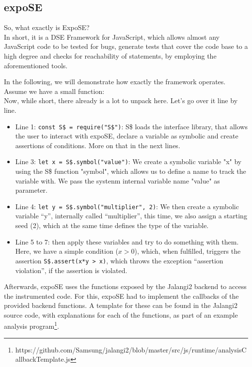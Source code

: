 \newpage
\subsection{expoSE}
\label{sec:expose}
So, what exactly is ExpoSE? \\
In short, it is a DSE Framework for JavaScript, which allows almost any JavaScript code to be tested for bugs, generate tests that cover the code base to a high degree and checks for reachability of statements, by employing the aforementioned tools. \cite{loring_expose_2017}

In the following, we will demonstrate how exactly the framework operates. \\
Assume we have a small function:\\
Now, while short, there already is a lot to unpack here. Let's go over it line by line. 
\begin{itemize}
    \item Line 1: \lstinline{const S$ = require("S$")}: S\$ loads the interface library, that allows the user to interact with expoSE, declare a variable as symbolic and create assertions of conditions. More on that in the next lines.
    \item Line 3: \lstinline{let x = S$.symbol("value")}: We create a symbolic variable "x" by using the S\$ function "symbol", which allows us to define a name to track the variable with. We pass the systenm internal variable name "value" as parameter.  
    \item Line 4: \lstinline{let y = S$.symbol("multiplier", 2)}: We then create a symbolic variable “y”, internally called “multiplier”, this time, we also assign a starting seed (2), which at the same time defines the type of the variable.
    \item Line 5 to 7: then apply these variables and try to do something with them. Here, we have a simple condition ($x > 0$), which, when fulfilled, triggers the assertion \lstinline{S$.assert(x*y > x)}, which throws the exception “assertion violation”, if  the assertion is violated.
\end{itemize}
Afterwards, expoSE uses the functions exposed by the Jalangi2 backend  to access the instrumented code. For this, expoSE had to implement the callbacks of the provided backend functions. A template for these can be found in the Jalangi2 source code, with explanations for each of the functions, as part of an example analysis program\footnote{https://github.com/Samsung/jalangi2/blob/master/src/js/runtime/analysisCallbackTemplate.js}. 
